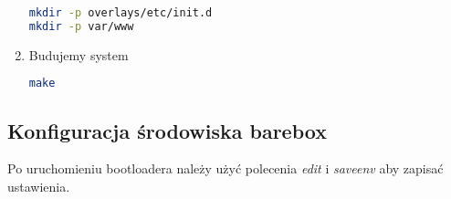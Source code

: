 \begin{enumerate}
	\begin{lstlisting}[language=bash]
mkdir -p overlays/etc/init.d
mkdir -p var/www
	\end{lstlisting}	
	
		
	\item Budujemy system
	\begin{lstlisting}[language=bash]
	make
	\end{lstlisting}	
\end{enumerate}

\subsection{Konfiguracja środowiska barebox}
Po uruchomieniu bootloadera należy użyć polecenia \emph{edit} i \emph{saveenv} aby
zapisać ustawienia.



